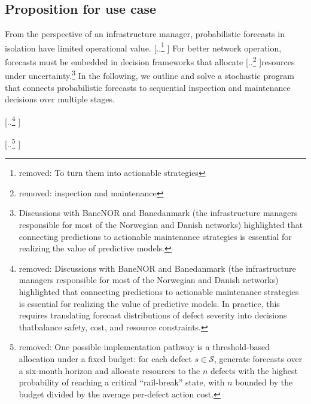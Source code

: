 \documentclass{article}
\providecommand{\DIFadd}[1]{{\protect\color{blue} \sf #1}} %
\providecommand{\DIFdel}[1]{{\protect\color{red} [..\footnote{removed: #1} ]}} %
\providecommand{\DIFaddbegin}{} %
\providecommand{\DIFaddend}{} %
\providecommand{\DIFdelbegin}{} %
\providecommand{\DIFdelend}{} %
\begin{document}
\DIFdelend \subsection{Proposition for use case} \label{sec:proposition_for_use}
From the perspective of an infrastructure manager, probabilistic forecasts in isolation have limited operational value. 
\DIFdelbegin \DIFdel{To turn them into actionable strategies}\DIFdelend \DIFaddbegin \DIFadd{For better network operation}\DIFaddend , forecasts must be embedded in decision frameworks that allocate \DIFdelbegin \DIFdel{inspection and maintenance }\DIFdelend resources under uncertainty.\DIFaddbegin \footnote{\DIFadd{Discussions with BaneNOR and Banedanmark (the infrastructure managers responsible for most of the Norwegian and Danish networks) highlighted that connecting predictions to actionable maintenance strategies is essential for realizing the value of predictive models.}}
\DIFadd{In the following, we outline and solve a stochastic program that connects probabilistic forecasts to sequential inspection and maintenance decisions over multiple stages.
}\DIFaddend 

\DIFdelbegin \DIFdel{Discussions with BaneNOR and Banedanmark (the infrastructure managers responsible for most of the Norwegian and Danish networks) highlighted that connecting predictions to actionable maintenance strategies is essential for realizing the value of predictive models.
In practice, this requires translating forecast distributions of defect severity into decisions thatbalance safety, cost, and resource constraints. 
}%

\DIFdel{One possible implementation pathway is a threshold-based allocation under a fixed budget: for each defect $s\in\mathcal{S}$, generate forecasts over a six-month horizon and allocate resources to the $n$ defects with the highest probability of reaching a critical “rail-break” state, with $n$ bounded by the budget divided by the average per-defect action cost.
}%
\end{document}
